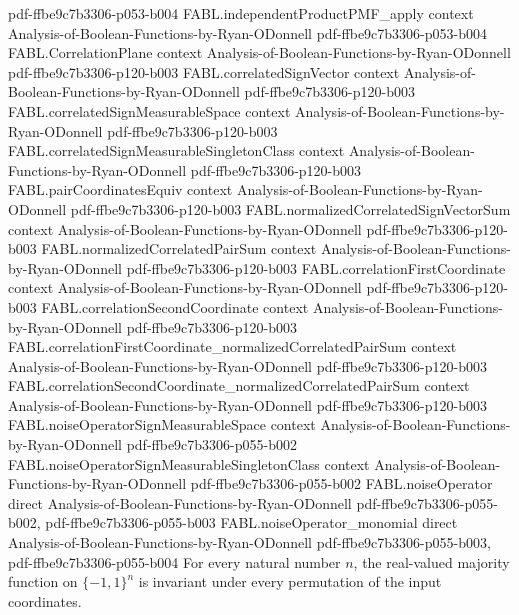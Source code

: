 \begin{theorem}
  {pdf-ffbe9c7b3306-p053-b004}
\proofstep
  {FABL.independentProductPMF_apply}
  {context}
  {Analysis-of-Boolean-Functions-by-Ryan-ODonnell}
  {pdf-ffbe9c7b3306-p053-b004}
\proofstep
  {FABL.CorrelationPlane}
  {context}
  {Analysis-of-Boolean-Functions-by-Ryan-ODonnell}
  {pdf-ffbe9c7b3306-p120-b003}
\proofstep
  {FABL.correlatedSignVector}
  {context}
  {Analysis-of-Boolean-Functions-by-Ryan-ODonnell}
  {pdf-ffbe9c7b3306-p120-b003}
\proofstep
  {FABL.correlatedSignMeasurableSpace}
  {context}
  {Analysis-of-Boolean-Functions-by-Ryan-ODonnell}
  {pdf-ffbe9c7b3306-p120-b003}
\proofstep
  {FABL.correlatedSignMeasurableSingletonClass}
  {context}
  {Analysis-of-Boolean-Functions-by-Ryan-ODonnell}
  {pdf-ffbe9c7b3306-p120-b003}
\proofstep
  {FABL.pairCoordinatesEquiv}
  {context}
  {Analysis-of-Boolean-Functions-by-Ryan-ODonnell}
  {pdf-ffbe9c7b3306-p120-b003}
\proofstep
  {FABL.normalizedCorrelatedSignVectorSum}
  {context}
  {Analysis-of-Boolean-Functions-by-Ryan-ODonnell}
  {pdf-ffbe9c7b3306-p120-b003}
\proofstep
  {FABL.normalizedCorrelatedPairSum}
  {context}
  {Analysis-of-Boolean-Functions-by-Ryan-ODonnell}
  {pdf-ffbe9c7b3306-p120-b003}
\proofstep
  {FABL.correlationFirstCoordinate}
  {context}
  {Analysis-of-Boolean-Functions-by-Ryan-ODonnell}
  {pdf-ffbe9c7b3306-p120-b003}
\proofstep
  {FABL.correlationSecondCoordinate}
  {context}
  {Analysis-of-Boolean-Functions-by-Ryan-ODonnell}
  {pdf-ffbe9c7b3306-p120-b003}
\proofstep
  {FABL.correlationFirstCoordinate_normalizedCorrelatedPairSum}
  {context}
  {Analysis-of-Boolean-Functions-by-Ryan-ODonnell}
  {pdf-ffbe9c7b3306-p120-b003}
\proofstep
  {FABL.correlationSecondCoordinate_normalizedCorrelatedPairSum}
  {context}
  {Analysis-of-Boolean-Functions-by-Ryan-ODonnell}
  {pdf-ffbe9c7b3306-p120-b003}
\proofstep
  {FABL.noiseOperatorSignMeasurableSpace}
  {context}
  {Analysis-of-Boolean-Functions-by-Ryan-ODonnell}
  {pdf-ffbe9c7b3306-p055-b002}
\proofstep
  {FABL.noiseOperatorSignMeasurableSingletonClass}
  {context}
  {Analysis-of-Boolean-Functions-by-Ryan-ODonnell}
  {pdf-ffbe9c7b3306-p055-b002}
\proofstep
  {FABL.noiseOperator}
  {direct}
  {Analysis-of-Boolean-Functions-by-Ryan-ODonnell}
  {pdf-ffbe9c7b3306-p055-b002,
    pdf-ffbe9c7b3306-p055-b003}
\proofstep
  {FABL.noiseOperator_monomial}
  {direct}
  {Analysis-of-Boolean-Functions-by-Ryan-ODonnell}
  {pdf-ffbe9c7b3306-p055-b003,
    pdf-ffbe9c7b3306-p055-b004}
For every natural number $n$, the real-valued majority function on $\{-1,1\}^n$ is
invariant under every permutation of the input coordinates.
\end{theorem}

